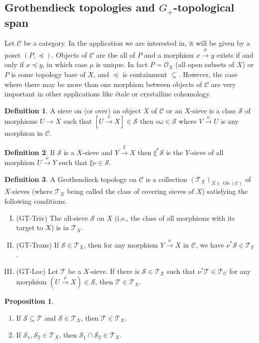 \documentclass[10pt]{article}
\numberwithin{equation}{section}
\theoremstyle{definition}
\newtheorem{proposition}{Proposition}[subsection]
\newtheorem{definition}{Definition}[subsection]
\DeclareMathOperator{\Ob}{Ob}
\newcommand{\Ouv}{\mathscr{O}}
\newcommand{\sC}[0]{\mathscr{C}}
\newcommand{\sS}[0]{\mathscr{S}}
\begin{document}
\subsection{Grothendieck topologies and $G_+$-topological span}
Let $\sC$ be a category. In the application we are interested in, it will be given by a poset $(P,\preceq)$. Objects of $\sC$ are the all of $P$ and a morphism $x\stackrel{\mu}{\to}y$ exists if and only if $x\preceq y$, in which case $\mu$ is unique. In fact $P=\Ouv_X$ (all open subsets of $X$) or $P$ is some topology base of $X$, and $\preceq$ is containment $\subseteq$. However, the case where there may be more than one morphism between objects of $\sC$ are very important in other applications like étale or crystalline cohomology.
\begin{definition}
    \label{definition_8_1}
    A sieve on (or over) an object $X$ of $\sC$ or an $X$-sieve is a class $\mathscr{S}$ of morphisms $U\to X$ such that $[U\stackrel{\nu}{\to}X]\in\mathscr{S}$ then $\nu\omega\in\mathscr{S}$ where $V\stackrel{\omega}{\to}U$ is any morphism in $\sC$.
\end{definition}
\begin{definition}
    \label{definition_8_1_1}
    If $\sS$ is a $X$-sieve and $Y\stackrel{\xi}{\to}X$ then $\xi^*\sS$ is the $Y$-sieve of all morphism $U\stackrel{\nu}{\to}Y$ such that $\xi\nu\in\sS$.
\end{definition}
\begin{definition}
    \label{definition_8_2}
    A Grothendieck topology on $\sC$ is a collection $(\mathcal{T}_X)_{X\in\Ob(\sC)}$ of $X$-sieves (where $\mathcal{T}_X$ being called the class of covering sieves of $X$) satisfying the following conditions.
    \begin{enumerate}[I.]
        \item (GT-Triv) The all-sieve $\sS$ on $X$ (i.e., the class of all morphisms with its target to $X$) is in $\mathcal{T}_X$.
        \item (GT-Trans) If $\sS\in\mathcal{T}_X$, then for any morphism $Y\stackrel{\nu}{\to}X$ in $\sC$, we have $ \nu^*\sS\in\mathcal{T}_Y$.
        \item (GT-Loc) Let $\mathscr{T}$ be a $X$-sieve. If there is $\sS\in\mathcal{T}_X$ such that $\nu^*\mathscr{T}\in\mathcal{T}_U$ for any morphism $(U\stackrel{\nu}{\to}X)\in\sS$, then $\mathscr{T}\in\mathcal{T}_X$.
    \end{enumerate}
\end{definition}
\begin{proposition}$\:$
    \label{fact_8_1}
    \begin{enumerate}
        \item If $\sS\subseteq\mathscr{T}$ and $\sS\in\mathcal{T}_X$, then $\mathscr{T}\in\mathcal{T}_X$.
        \item If $\sS_1,\sS_2\in\mathcal{T}_X$, then $\sS_1\cap \sS_2\in\mathcal{T}_X$.
    \end{enumerate}
\end{proposition}
\end{document}
